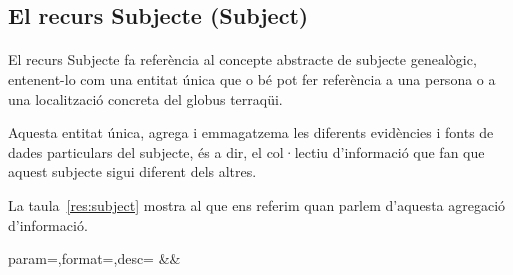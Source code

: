 \subsection{El recurs Subjecte (Subject)}

    \paragraph{}
    El recurs Subjecte fa referència al concepte abstracte de subjecte genealògic, entenent-lo com una entitat única que o bé pot fer referència a una persona o a una localització concreta del globus terraqüi.

    Aquesta entitat única, agrega i emmagatzema les diferents evidències i fonts de dades particulars del subjecte, és a dir, el col·lectiu d'informació que fan que aquest subjecte sigui diferent dels altres.

    La taula~\ref{res:subject} mostra al que ens referim quan parlem d'aquesta agregació d'infor\-mació.

    \clearpage

    \begin{center}
             {param=\param,format=\format,desc=\desc}
             {\param&\format&\desc}
     \end{center}

